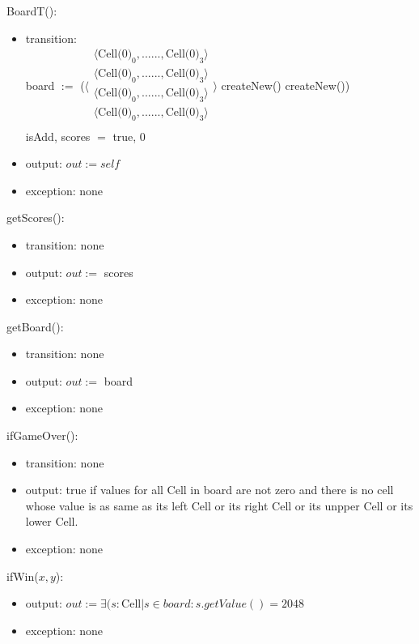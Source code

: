 \documentclass[12pt]{article}
\begin{document}
BoardT():
\begin{itemize}
\item transition: \\
      board $:=$ 
      ($\langle \begin{array}{c}
      \langle \mbox{Cell(0)}_0, ... ... ,\mbox{Cell(0)}_3 \rangle\\
      \langle \mbox{Cell(0)}_0, ... ... ,\mbox{Cell(0)}_3 \rangle\\
      \langle \mbox{Cell(0)}_0, ... ... ,\mbox{Cell(0)}_3 \rangle\\
      \langle \mbox{Cell(0)}_0, ... ... ,\mbox{Cell(0)}_3 \rangle\\
      \end{array} \rangle$ \Rightarrow createNew() \Rightarrow createNew()) \\ 
      isAdd, scores $=$ true, 0
\item output: $out := \mathit{self}$
\item exception: none
\end{itemize}

\noindent getScores():
\begin{itemize}
\item transition: none
\item output: $out :=$ scores
\item exception: none
\end{itemize}

\noindent getBoard():
\begin{itemize}
\item transition: none
\item output: $out :=$ board
\item exception: none
\end{itemize}

\noindent ifGameOver():
\begin{itemize}
\item transition: none
\item output: true if values for all Cell in board are not zero and there is no cell whose value is as same as its left Cell or its right Cell or its unpper Cell or its lower Cell. 
\item exception: none
\end{itemize}

\noindent ifWin($x, y$):
\begin{itemize}
\item output: 
$out := {\exists(s: \text{Cell} | s \in board : s.getValue() = 2048}$
\item exception: none
\end{itemize}
\end{document}
